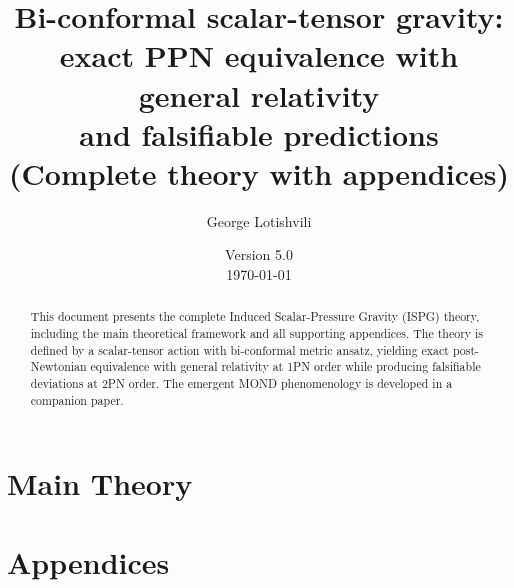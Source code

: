 \documentclass[11pt,a4paper]{article}
\begin{document}

\title{%
Bi-conformal scalar-tensor gravity:\\
exact PPN equivalence with general relativity\\
and falsifiable predictions\\[1em]
\large (Complete theory with appendices)
}

\author{George Lotishvili}
\date{Version 5.0 \\ \today}

\maketitle

\begin{abstract}
This document presents the complete Induced Scalar-Pressure Gravity (ISPG) theory,
including the main theoretical framework and all supporting appendices.
The theory is defined by a scalar-tensor action with bi-conformal metric ansatz,
yielding exact post-Newtonian equivalence with general relativity at 1PN order
while producing falsifiable deviations at 2PN order.
The emergent MOND phenomenology is developed in a companion paper.
\end{abstract}

\tableofcontents
\newpage

\part{Main Theory}
\label{part:main}



\newpage
\part{Appendices}
\label{part:appendices}
\end{document}
